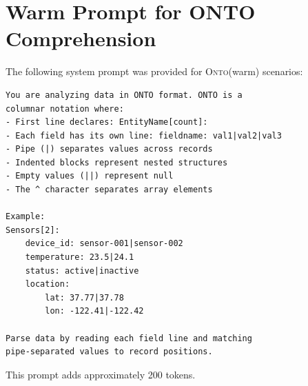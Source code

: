 \documentclass[10pt,twocolumn]{article}
\newcommand{\onto}{\textsc{Onto}\xspace}
\begin{document}
\appendix
\renewcommand{\thesection}{Appendix \Alph{section}}
\section{Warm Prompt for ONTO Comprehension}
\label{app:prompt}

The following system prompt was provided for \onto (warm) scenarios:

\begin{lstlisting}[style=onto,basicstyle=\ttfamily\tiny]
You are analyzing data in ONTO format. ONTO is a 
columnar notation where:
- First line declares: EntityName[count]:
- Each field has its own line: fieldname: val1|val2|val3
- Pipe (|) separates values across records
- Indented blocks represent nested structures
- Empty values (||) represent null
- The ^ character separates array elements

Example:
Sensors[2]:
    device_id: sensor-001|sensor-002
    temperature: 23.5|24.1
    status: active|inactive
    location:
        lat: 37.77|37.78
        lon: -122.41|-122.42

Parse data by reading each field line and matching 
pipe-separated values to record positions.
\end{lstlisting}

This prompt adds approximately 200 tokens.
\end{document}
